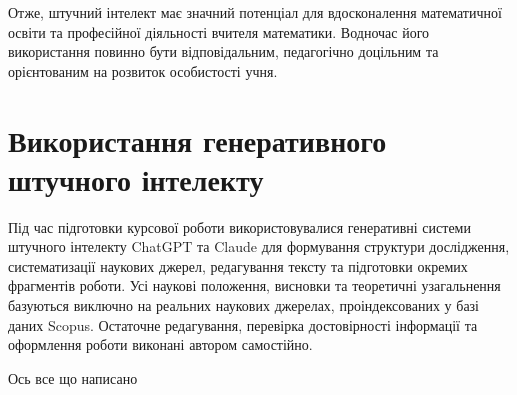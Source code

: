 Отже, штучний інтелект має значний потенціал для вдосконалення математичної освіти та професійної діяльності вчителя математики. Водночас його використання повинно бути відповідальним, педагогічно доцільним та орієнтованим на розвиток особистості учня.


\section*{Використання генеративного штучного інтелекту}


Під час підготовки курсової роботи використовувалися генеративні системи штучного інтелекту ChatGPT та Claude для формування структури дослідження, систематизації наукових джерел, редагування тексту та підготовки окремих фрагментів роботи. Усі наукові положення, висновки та теоретичні узагальнення базуються виключно на реальних наукових джерелах, проіндексованих у базі даних Scopus. Остаточне редагування, перевірка достовірності інформації та оформлення роботи виконані автором самостійно.


\newpage

\printbibliography

 Ось все що написано